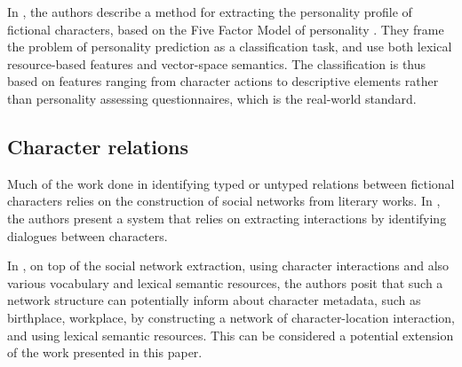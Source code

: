 In \cite{flekova2015personality}, the authors describe a method for extracting the personality profile of fictional characters, based on the Five Factor Model of personality \cite{mccrae1992introduction}. They frame the problem of personality prediction as a classification task, and use both lexical resource-based features and vector-space semantics. The classification is thus based on features ranging from character actions to descriptive elements rather than personality assessing questionnaires, which is the real-world standard.

\subsection{Character relations}
Much of the work done in identifying typed or untyped relations between fictional characters relies on the construction of social networks from literary works. In \cite{elson2010extracting}, the authors present a system that relies on extracting interactions by identifying dialogues between characters. 

In \cite{kokkinakis2011character}, on top of the social network extraction, using character interactions and also various vocabulary and lexical semantic resources, the authors posit that such a network structure can potentially inform about character metadata, such as birthplace, workplace, by constructing a network of character-location interaction, and using lexical semantic resources. This can be considered a potential extension of the work presented in this paper.

